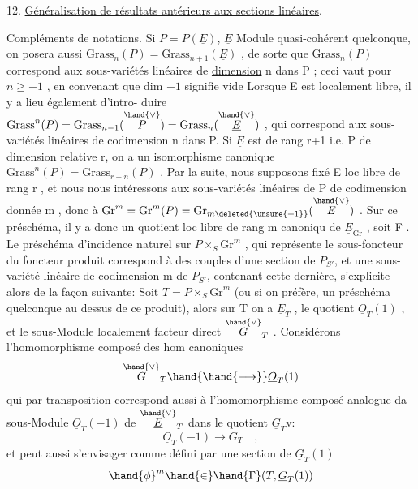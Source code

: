 
12. \uline{Généralisation de résultats antérieurs aux sections linéaires}.

Compléments de notations. Si $P = P(\underline{E})$, $\underline{E}$ Module quasi-cohérent
quelconque, on posera aussi $\mathrm{Grass}_n(P) = \mathrm{Grass}_{n+1}(\underline{E})$ , de sorte que
$\mathrm{Grass}_n(P)$ correspond aux sous-variétés linéaires de \uline{dimension} n dans
P ; ceci vaut pour $n \geq -1$ , en convenant que dim $-1$ signifie vide
Lorsque E est localement libre,  il y a lieu également d'intro-%
duire $\mathrm{Grass}^n(P) = \mathrm{Grass}_{n-1}(\overset{\hand{\vee}}{P}) = \mathrm{Grass}_n(\overset{\hand{\vee}}{\underline{E}})$ , qui correspond aux sous-%
variétés linéaires de codimension n dans P. Si $\underline{E}$ est de rang r+1 i.e.
P de dimension relative r, on a un isomorphisme canonique
$\mathrm{Grass}^n(P) = \mathrm{Grass}_{r-n}(P)$ . Par la suite, nous supposons fixé E loc
libre de rang r , et nous nous intéressons aux sous-variétés linéaires
de P de codimension donnée m , donc à $\mathrm{Gr}^m = \mathrm{Gr}^m(P) = \mathrm{Gr}_{m\deleted{\unsure{+1}}}(\overset{\hand{\vee}}{E})$ .
Sur ce préschéma, il y a donc un quotient  loc libre de rang m canoniqu
de $\underline{E}_{\mathrm{Gr}}$ , soit F .  Le préschéma d'incidence naturel
sur $P\times_S \mathrm{Gr}^m$ , qui représente le sous-foncteur du foncteur produit
correspond à des couples d'une section de $P_{S'}$, et une sous-variété
linéaire de codimension m de $P_{S'}$, \uline{contenant} cette dernière, s'explicite
alors de la façon suivante: Soit $T=P\times_S \mathrm{Gr}^m$ (ou si on préfère, un
préschéma quelconque au dessus de ce produit), alors sur  T on a
$\underline{E}_T$ , le quotient $\underline{O}_T(1)$ , et le sous-Module localement facteur direct
$\overset{\hand{\vee}}{\underline{G}}_T$ . Considérons l'homomorphisme composé des hom canoniques
\[ \overset{\hand{\vee}}{G}_T \hand{\hand{\longrightarrow}} \underline{O}_T(1) \]
qui par transposition correspond aussi à l'homomorphisme composé
analogue da sous-Module $\underline{O}_T(-1)$ de $\overset{\hand{\vee}}{\underline{E}}_T$ dans le quotient $\underline{G}_T\mathrm{v}$:
\[ \underline{O}_T(-1) \longrightarrow G_T \quad , \]
et peut aussi s'envisager comme défini par une section de $\underline{G}_T(1)$
\[ \hand{\phi}^m \hand{\in} \hand{\Gamma}(T, \underline{G}_T(1)) \]

